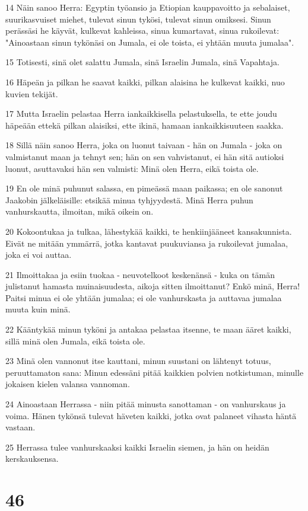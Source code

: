\par 14 Näin sanoo Herra: Egyptin työansio ja Etiopian kauppavoitto ja sebalaiset, suurikasvuiset miehet, tulevat sinun tykösi, tulevat sinun omiksesi. Sinun perässäsi he käyvät, kulkevat kahleissa, sinua kumartavat, sinua rukoilevat: "Ainoastaan sinun tykönäsi on Jumala, ei ole toista, ei yhtään muuta jumalaa".
\par 15 Totisesti, sinä olet salattu Jumala, sinä Israelin Jumala, sinä Vapahtaja.
\par 16 Häpeän ja pilkan he saavat kaikki, pilkan alaisina he kulkevat kaikki, nuo kuvien tekijät.
\par 17 Mutta Israelin pelastaa Herra iankaikkisella pelastuksella, te ette joudu häpeään ettekä pilkan alaisiksi, ette ikinä, hamaan iankaikkisuuteen saakka.
\par 18 Sillä näin sanoo Herra, joka on luonut taivaan - hän on Jumala - joka on valmistanut maan ja tehnyt sen; hän on sen vahvistanut, ei hän sitä autioksi luonut, asuttavaksi hän sen valmisti: Minä olen Herra, eikä toista ole.
\par 19 En ole minä puhunut salassa, en pimeässä maan paikassa; en ole sanonut Jaakobin jälkeläisille: etsikää minua tyhjyydestä. Minä Herra puhun vanhurskautta, ilmoitan, mikä oikein on.
\par 20 Kokoontukaa ja tulkaa, lähestykää kaikki, te henkiinjääneet kansakunnista. Eivät ne mitään ymmärrä, jotka kantavat puukuviansa ja rukoilevat jumalaa, joka ei voi auttaa.
\par 21 Ilmoittakaa ja esiin tuokaa - neuvotelkoot keskenänsä - kuka on tämän julistanut hamasta muinaisuudesta, aikoja sitten ilmoittanut? Enkö minä, Herra! Paitsi minua ei ole yhtään jumalaa; ei ole vanhurskasta ja auttavaa jumalaa muuta kuin minä.
\par 22 Kääntykää minun tyköni ja antakaa pelastaa itsenne, te maan ääret kaikki, sillä minä olen Jumala, eikä toista ole.
\par 23 Minä olen vannonut itse kauttani, minun suustani on lähtenyt totuus, peruuttamaton sana: Minun edessäni pitää kaikkien polvien notkistuman, minulle jokaisen kielen valansa vannoman.
\par 24 Ainoastaan Herrassa - niin pitää minusta sanottaman - on vanhurskaus ja voima. Hänen tykönsä tulevat häveten kaikki, jotka ovat palaneet vihasta häntä vastaan.
\par 25 Herrassa tulee vanhurskaaksi kaikki Israelin siemen, ja hän on heidän kerskauksensa.

\chapter{46}

